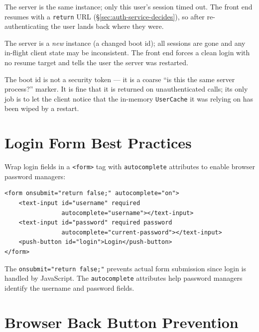 \begin{description}[style=nextline]
  \item[Session expiry] The server is the same instance; only this user's session timed out.  The front end resumes with a \texttt{return} URL (\S\ref{sec:auth-service-decides}), so after re-authenticating the user lands back where they were.
  \item[Server restart] The server is a \emph{new} instance (a changed boot id); all sessions are gone and any in-flight client state may be inconsistent.  The front end forces a clean login with no resume target and tells the user the server was restarted.
\end{description}

\begin{notebox}
The boot id is not a security token --- it is a coarse ``is this the same server process?'' marker.  It is fine that it is returned on unauthenticated calls; its only job is to let the client notice that the in-memory \texttt{UserCache} it was relying on has been wiped by a restart.
\end{notebox}

\section{Login Form Best Practices}
\label{sec:auth-form}

Wrap login fields in a \texttt{<form>} tag with \texttt{autocomplete} attributes to enable browser password managers:

\begin{lstlisting}[style=html]
<form onsubmit="return false;" autocomplete="on">
    <text-input id="username" required
                autocomplete="username"></text-input>
    <text-input id="password" required password
                autocomplete="current-password"></text-input>
    <push-button id="login">Login</push-button>
</form>
\end{lstlisting}

\noindent
The \texttt{onsubmit="return false;"} prevents actual form submission since login is handled by JavaScript.  The \texttt{autocomplete} attributes help password managers identify the username and password fields.

\section{Browser Back Button Prevention}
\label{sec:auth-backbutton}

